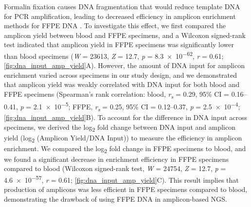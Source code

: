 Formalin fixation causes DNA fragmentation that would reduce template DNA for PCR amplification, leading to decreased efficiency in amplicon enrichment methods for FFPE DNA \cite{Didelot2013, Do2015a, Wong2013, Wong2014}. To investigate this effect, we first compared the amplicon yield between blood and FFPE specimens, and a Wilcoxon signed-rank test indicated that amplicon yield in FFPE specimens was significantly lower than blood specimens (\textit{W} = 23613, \textit{Z} = 12.7, \textit{p} = \num{8.3e-62}, \textit{r} = 0.61; \autoref{fig:dna_input_amp_yield}A). However, the amount of DNA input for amplicon enrichment varied across specimens in our study design, and we demonstrated that amplicon yield was weakly correlated with DNA input for both blood and FFPE specimens (Spearman's rank correlation: blood, \textit{r\textsubscript{s}} = 0.29, 95\% CI = 0.16--0.41, \textit{p} = \num{2.1e-5}; FFPE, \textit{r\textsubscript{s}} = 0.25, 95\% CI = 0.12--0.37, \textit{p} = \num{2.5e-4}; \autoref{fig:dna_input_amp_yield}B). To account for the difference in DNA input across specimens, we derived the log\textsubscript{2} fold change between DNA input and amplicon yield (log\textsubscript{2} (Amplicon Yield/DNA Input)) to measure the efficiency in amplicon enrichment. We compared the log\textsubscript{2} fold change in FFPE specimens to blood, and we found a significant decrease in enrichment efficiency in FFPE specimens compared to blood (Wilcoxon signed-rank test, \textit{W} = 24754, \textit{Z} = 12.7, \textit{p} = \num{4.6e-57}, \textit{r} = 0.61; \autoref{fig:dna_input_amp_yield}C). This result implies that production of amplicons was less efficient in FFPE specimens compared to blood, demonstrating the drawback of using FFPE DNA in amplicon-based NGS.

